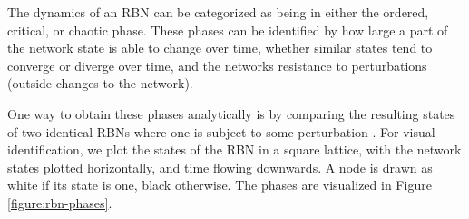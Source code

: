The dynamics of an RBN can be categorized as being in either the ordered, critical, or chaotic phase.
These phases can be identified by how large a part of the network state is able to change over time,
whether similar states tend to converge or diverge over time,
and the networks resistance to perturbations (outside changes to the network).

One way to obtain these phases analytically is by comparing the resulting states of two identical RBNs where one is subject to some perturbation \cite{gershenson2004introduction}.
For visual identification, we plot the states of the RBN in a square lattice,
with the network states plotted horizontally, and time flowing downwards.
A node is drawn as white if its state is one, black otherwise.
The phases are visualized in Figure \ref{figure:rbn-phases}.

